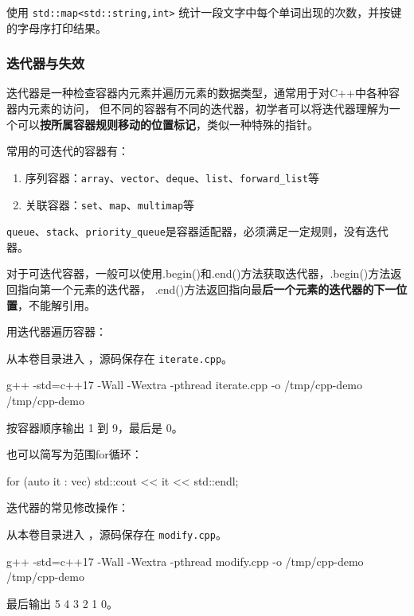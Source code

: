 \begin{exercise}\label{ex:v1-cpp-words}

使用 \texttt{std::map<std::string,int>} 统计一段文字中每个单词出现的次数，并按键的字母序打印结果。
\end{exercise}

\subsubsection{迭代器与失效}

迭代器是一种检查容器内元素并遍历元素的数据类型，通常用于对C++中各种容器内元素的访问，
但不同的容器有不同的迭代器，初学者可以将迭代器理解为一个可以\textbf{按所属容器规则移动的位置标记}，类似一种特殊的指针。

常用的可迭代的容器有：

\begin{enumerate}
    \item 序列容器：\texttt{array}、\texttt{vector}、\texttt{deque}、\texttt{list}、\texttt{forward\_list}等
    \item 关联容器：\texttt{set}、\texttt{map}、\texttt{multimap}等
\end{enumerate}

\texttt{queue}、\texttt{stack}、\texttt{priority\_queue}是容器适配器，必须满足一定规则，没有迭代器。

对于可迭代容器，一般可以使用.begin()和.end()方法获取迭代器，.begin()方法返回指向第一个元素的迭代器，
.end()方法返回指向最\textbf{后一个元素的迭代器的下一位置}，不能解引用。

\begin{example}
用迭代器遍历容器：



从本卷目录进入 ，源码保存在 \texttt{iterate.cpp}。
\begin{tbash}
g++ -std=c++17 -Wall -Wextra -pthread iterate.cpp -o /tmp/cpp-demo
/tmp/cpp-demo
\end{tbash}
按容器顺序输出 1 到 9，最后是 0。
\end{example}

也可以简写为范围for循环：

\begin{tcode}
for (auto it : vec) {
    std::cout << it << std::endl;
}
\end{tcode}

\begin{example}
迭代器的常见修改操作：



从本卷目录进入 ，源码保存在 \texttt{modify.cpp}。
\begin{tbash}
g++ -std=c++17 -Wall -Wextra -pthread modify.cpp -o /tmp/cpp-demo
/tmp/cpp-demo
\end{tbash}
最后输出 5 4 3 2 1 0。
\end{example}

